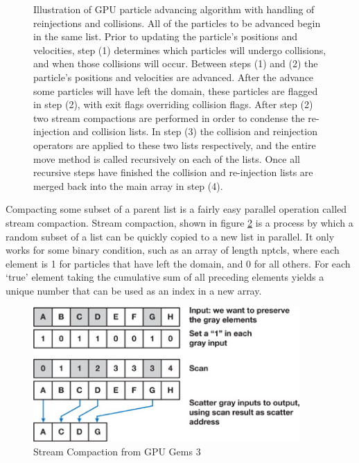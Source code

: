 \begin{figure}
\begin{center}

\end{center}
\caption[Illustration of GPU particle advancing algorithm]{Illustration of GPU particle advancing algorithm with handling of reinjections and collisions. All of the particles to be advanced begin in the same list. Prior to updating the particle's positions and velocities, step (1) determines which particles will undergo collisions, and when those collisions will occur. Between steps (1) and (2) the particle's positions and velocities are advanced. After the advance some particles will have left the domain, these particles are flagged in step (2), with exit flags overriding collision flags. After step (2) two stream compactions are performed in order to condense the re-injection and collision lists. In step (3) the collision and reinjection operators are applied to these two lists respectively, and the entire move method is called recursively on each of the lists. Once all recursive steps have finished the collision and re-injection lists are merged back into the main array in step (4). }
\label{fig:padvnc}
\end{figure}

Compacting some subset of a parent list is a fairly easy parallel operation called stream compaction. Stream compaction, shown in figure \ref{fig:stream_compact} is a process by which a random subset of a list can be quickly copied to a new list in parallel. It only works for some binary condition, such as an array of length nptcls, where each element is 1 for particles that have left the domain, and 0 for all others. For each `true' element taking the cumulative sum of all preceding elements yields a unique number that can be used as an index in a new array. 

\begin{figure}
\begin{center}
\includegraphics[width=4in]{implementation/stream_compact.jpg}
\end{center}
\caption[Stream Compaction]{Stream Compaction from GPU Gems 3 \cite{Harris2007}}
\label{fig:stream_compact}
\end{figure}



